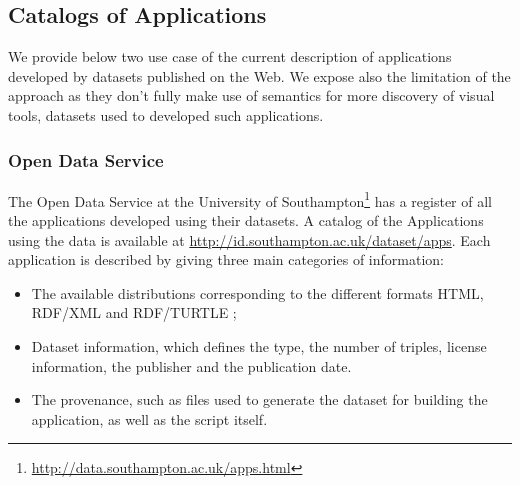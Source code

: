 \subsection{Catalogs of Applications}
We provide below two use case of the current description of applications developed by datasets published on the Web. We expose also the limitation of the approach as they don't fully make use of semantics for more discovery of visual tools, datasets used to developed such applications.

\subsubsection{Open Data Service}
The Open Data Service at the University of Southampton\footnote{\url{http://data.southampton.ac.uk/apps.html}} has a register of all the applications developed using their datasets. A catalog of the Applications using the data is available at \url{http://id.southampton.ac.uk/dataset/apps}. Each application is described by giving three main categories of information:
\begin{itemize}
\item The available distributions corresponding to the different formats HTML, RDF/XML and RDF/TURTLE ;
\item Dataset information, which defines the type, the number of triples, license information, the publisher and the publication date.
\item The provenance, such as files used to generate the dataset for building the application, as well as the script itself.
\end{itemize} 

